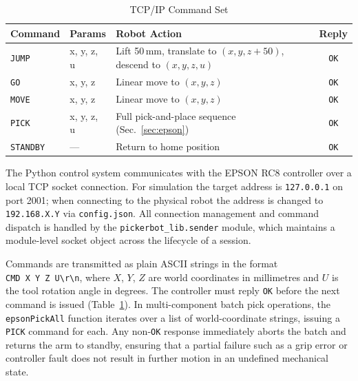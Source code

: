\documentclass{MIPRO}
\begin{document}
\begin{table}[t]
  \caption{TCP/IP Command Set}
  \label{tab:commands}
  \renewcommand{\arraystretch}{1.35}
  \centering
  \setlength{\tabcolsep}{4pt}
  \begin{tabular}{@{} l l p{3.3cm} c @{}}
    \toprule
    \textbf{Command} & \textbf{Params} & \textbf{Robot Action} & \textbf{Reply} \\
    \midrule
    \texttt{JUMP}    & x, y, z, u & Lift 50\,mm, translate to $(x,y,z{+}50)$, descend to $(x,y,z,u)$ & \texttt{OK} \\[2pt]
    \texttt{GO}      & x, y, z    & Linear move to $(x,y,z)$                                         & \texttt{OK} \\[2pt]
    \texttt{MOVE}    & x, y, z    & Linear move to $(x,y,z)$                                         & \texttt{OK} \\[2pt]
    \texttt{PICK}    & x, y, z, u & Full pick-and-place sequence (Sec.~\ref{sec:epson})               & \texttt{OK} \\[2pt]
    \texttt{STANDBY} & ---        & Return to home position                                           & \texttt{OK} \\
    \bottomrule
  \end{tabular}
\end{table}

The Python control system communicates with the EPSON RC8 controller over a local TCP socket connection. For simulation the target address is \texttt{127.0.0.1} on port 2001; when connecting to the physical robot the address is changed to \texttt{192.168.X.Y} via \texttt{config.json}. All connection management and command dispatch is handled by the \texttt{pickerbot\_lib.sender} module, which maintains a module-level socket object across the lifecycle of a session.

Commands are transmitted as plain ASCII strings in the format \texttt{CMD~X~Y~Z~U\textbackslash r\textbackslash n}, where $X$, $Y$, $Z$ are world coordinates in millimetres and $U$ is the tool rotation angle in degrees. The controller must reply \texttt{OK} before the next command is issued (Table~\ref{tab:commands}). In multi-component batch pick operations, the \texttt{epsonPickAll} function iterates over a list of world-coordinate strings, issuing a \texttt{PICK} command for each. Any non-\texttt{OK} response immediately aborts the batch and returns the arm to standby, ensuring that a partial failure such as a grip error or controller fault does not result in further motion in an undefined mechanical state.
\end{document}
